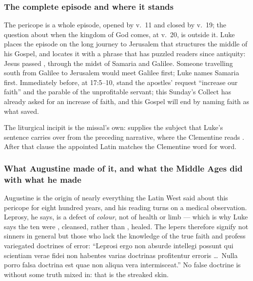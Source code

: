 
\subsubsection*{The complete episode and where it stands}

The pericope is a whole episode, opened by v.~11 and closed by v.~19; the
question about when the kingdom of God comes, at v.~20, is outside it. Luke
places the episode on the long journey to Jerusalem that structures the middle
of his Gospel, and locates it with a phrase that has puzzled readers since
antiquity: Jesus passed , through the
midst of Samaria and Galilee. Someone travelling south from Galilee to
Jerusalem would meet Galilee first; Luke names Samaria first. Immediately
before, at 17:5--10, stand the apostles' request ``increase our faith'' and the
parable of the unprofitable servant; this Sunday's Collect has already asked
for an increase of faith, and this Gospel will end by naming faith as what
saved.

The liturgical incipit is the missal's own:  supplies the subject that Luke's sentence carries over
from the preceding narrative, where the Clementine reads . After that clause the appointed Latin matches the
Clementine word for word.

\subsubsection*{What Augustine made of it, and what the Middle Ages did with what he made}

Augustine is the origin of nearly everything the Latin West said about this
pericope for eight hundred years, and his reading turns on a medical
observation. Leprosy, he says, is a defect of \textit{colour}, not of health
or limb --- which is why Luke says the ten were , cleansed,
rather than , healed. The lepers therefore signify not sinners
in general but those who lack the knowledge of the true faith and profess
variegated doctrines of error: ``Leprosi ergo non absurde intellegi possunt
qui scientiam verae fidei non habentes varias doctrinas profitentur erroris
\dots\ Nulla porro falsa doctrina est quae non aliqua vera intermisceat.'' No
false doctrine is without some truth mixed in: that is the streaked skin.


